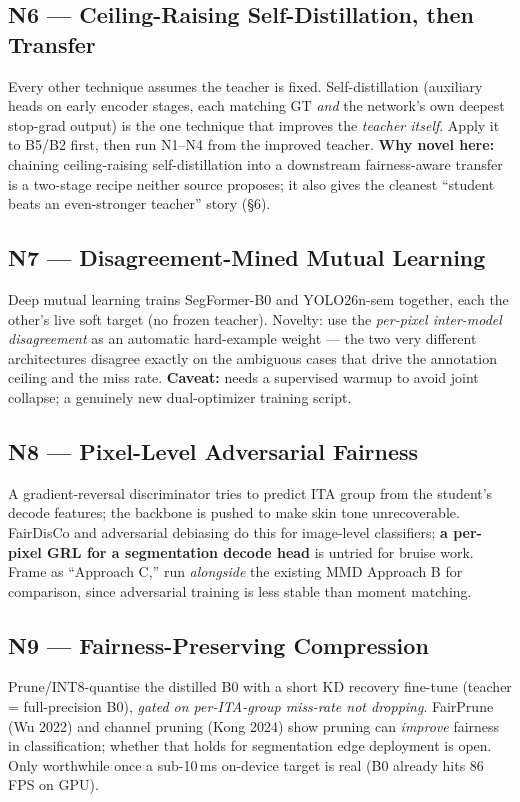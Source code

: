 \documentclass[11pt]{article}
\newcommand{\novel}[1]{\textcolor{noveltygreen}{\textbf{#1}}}
\begin{document}
\subsection{N6 --- Ceiling-Raising Self-Distillation, then Transfer}
Every other technique assumes the teacher is fixed. Self-distillation (auxiliary heads on early
encoder stages, each matching GT \emph{and} the network's own deepest stop-grad output) is the
one technique that improves the \emph{teacher itself}. Apply it to B5/B2 first, then run N1--N4
from the improved teacher. \textbf{Why novel here:} chaining ceiling-raising self-distillation
into a downstream fairness-aware transfer is a two-stage recipe neither source proposes; it also
gives the cleanest ``student beats an even-stronger teacher'' story (\S6).

\subsection{N7 --- Disagreement-Mined Mutual Learning}
Deep mutual learning trains SegFormer-B0 and YOLO26n-sem together, each the other's live soft
target (no frozen teacher). Novelty: use the \emph{per-pixel inter-model disagreement} as an
automatic hard-example weight --- the two very different architectures disagree exactly on the
ambiguous cases that drive the annotation ceiling and the miss rate. \textbf{Caveat:} needs a
supervised warmup to avoid joint collapse; a genuinely new dual-optimizer training script.

\subsection{N8 --- Pixel-Level Adversarial Fairness}
A gradient-reversal discriminator tries to predict ITA group from the student's decode features;
the backbone is pushed to make skin tone unrecoverable. FairDisCo and adversarial debiasing do
this for image-level classifiers; \novel{a per-pixel GRL for a segmentation decode head} is
untried for bruise work. Frame as ``Approach C,'' run \emph{alongside} the existing MMD Approach
B for comparison, since adversarial training is less stable than moment matching.

\subsection{N9 --- Fairness-Preserving Compression}
Prune/INT8-quantise the distilled B0 with a short KD recovery fine-tune (teacher = full-precision
B0), \emph{gated on per-ITA-group miss-rate not dropping}. FairPrune (Wu 2022) and channel
pruning (Kong 2024) show pruning can \emph{improve} fairness in classification; whether that
holds for segmentation edge deployment is open. Only worthwhile once a sub-10\,ms on-device
target is real (B0 already hits 86 FPS on GPU).
\end{document}
